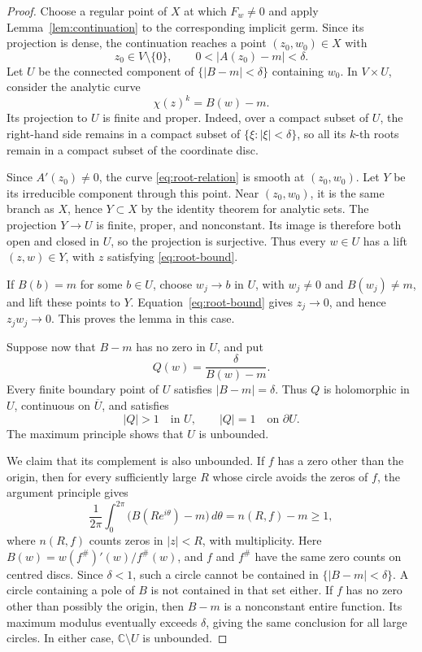\documentclass[11pt]{article}
\theoremstyle{remark}
\numberwithin{equation}{section}
\newcommand{\C}{\mathbb C}
\begin{document}
\begin{proof}
Choose a regular point of \(X\) at which \(F_w\ne0\) and apply
Lemma~\ref{lem:continuation} to the corresponding implicit germ.
Since its projection is dense, the continuation reaches a point
\((z_0,w_0)\in X\) with
\[
 z_0\in V\setminus\{0\},\qquad
 0<|A(z_0)-m|<\delta.
\]
Let \(U\) be the connected component of \(\{|B-m|<\delta\}\)
containing \(w_0\).
In \(V\times U\), consider the analytic curve
\begin{equation}\label{eq:root-relation}
 \chi(z)^k=B(w)-m.
\end{equation}
Its projection to \(U\) is finite and proper. Indeed, over a compact
subset of \(U\), the right-hand side remains in a compact subset of
\(\{\xi:|\xi|<\delta\}\), so all its \(k\)-th roots remain in a
compact subset of the coordinate disc.

Since \(A'(z_0)\ne0\), the curve \eqref{eq:root-relation} is smooth
at \((z_0,w_0)\). Let \(Y\) be its irreducible component through this
point. Near \((z_0,w_0)\), it is the same branch as \(X\), hence
\(Y\subset X\) by the identity theorem for analytic sets. The
projection \(Y\to U\) is finite, proper, and nonconstant. Its image is
therefore both open and closed in \(U\), so the projection is
surjective. Thus every \(w\in U\) has a lift \((z,w)\in Y\), with
\(z\) satisfying \eqref{eq:root-bound}.

If \(B(b)=m\) for some \(b\in U\), choose \(w_j\to b\) in \(U\),
with \(w_j\ne0\) and \(B(w_j)\ne m\), and lift these points to \(Y\).
Equation~\eqref{eq:root-bound} gives \(z_j\to0\), and hence
\(z_jw_j\to0\). This proves the lemma in this case.

Suppose now that \(B-m\) has no zero in \(U\), and put
\begin{equation}\label{eq:Q}
 Q(w)=\frac{\delta}{B(w)-m}.
\end{equation}
Every finite boundary point of \(U\) satisfies \(|B-m|=\delta\).
Thus \(Q\) is holomorphic in \(U\), continuous on \(\overline U\),
and satisfies
\[
 |Q|>1\quad\text{in }U,
 \qquad |Q|=1\quad\text{on }\partial U.
\]
The maximum principle shows that \(U\) is unbounded.

We claim that its complement is also unbounded.
If \(f\) has a zero other than the origin, then for every sufficiently
large \(R\) whose circle avoids the zeros of \(f\), the argument
principle gives
\begin{equation}\label{eq:mean}
 \frac1{2\pi}\int_0^{2\pi}
 \bigl(B(Re^{i\theta})-m\bigr)\,d\theta
 =n(R,f)-m\ge1,
\end{equation}
where \(n(R,f)\) counts zeros in \(|z|<R\), with multiplicity.
Here \(B(w)=w(f^\#)'(w)/f^\#(w)\), and \(f\) and \(f^\#\) have
the same zero counts on centred discs.
Since \(\delta<1\), such a circle cannot be contained in
\(\{|B-m|<\delta\}\). A circle containing a pole of \(B\) is not
contained in that set either.
If \(f\) has no zero other than possibly the origin, then \(B-m\)
is a nonconstant entire function. Its maximum modulus eventually
exceeds \(\delta\), giving the same conclusion for all large circles.
In either case, \(\C\setminus U\) is unbounded.


\end{proof}
\end{document}
